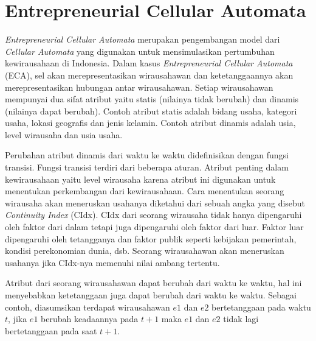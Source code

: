 \section{Entrepreneurial Cellular Automata}
\label{sec:ECA}
\textit{Entrepreneurial Cellular Automata} merupakan pengembangan model dari \textit{Cellular Automata} yang digunakan untuk mensimulasikan pertumbuhan kewirausahaan di Indonesia. Dalam kasus \textit{Entrepreneurial Cellular Automata} (ECA), sel akan merepresentasikan wirausahawan dan ketetanggaannya akan merepresentasikan hubungan antar wirausahawan. Setiap wirausahawan mempunyai dua sifat atribut yaitu statis (nilainya tidak berubah) dan dinamis (nilainya dapat berubah). Contoh atribut statis adalah bidang usaha, kategori usaha, lokasi geografis dan jenis kelamin. Contoh atribut dinamis adalah usia, level wirausaha dan usia usaha.  

Perubahan atribut dinamis dari waktu ke waktu didefinisikan dengan fungsi transisi. Fungsi transisi terdiri dari beberapa aturan. Atribut penting dalam kewirausahaan yaitu level wirausaha karena atribut ini digunakan untuk menentukan perkembangan dari kewirausahaan. Cara menentukan seorang wirausaha akan meneruskan usahanya diketahui dari sebuah angka yang disebut \textit{Continuity Index} (CIdx). CIdx dari seorang wirausaha tidak hanya dipengaruhi oleh faktor dari dalam tetapi juga dipengaruhi oleh faktor dari luar. Faktor luar dipengaruhi oleh tetangganya dan faktor publik seperti kebijakan pemerintah, kondisi perekonomian dunia, dsb. Seorang wirausahawan akan meneruskan usahanya jika CIdx-nya memenuhi nilai ambang tertentu.

Atribut dari seorang wirausahawan dapat berubah dari waktu ke waktu, hal ini menyebabkan ketetanggaan juga dapat berubah dari waktu ke waktu. Sebagai contoh, diasumsikan terdapat wirausahawan $e1$ dan $e2$ bertetanggaan pada waktu $t$, jika $e1$ berubah keadaannya pada $t+1$ maka $e1$ dan $e2$ tidak lagi bertetanggaan pada saat $t+1$.

